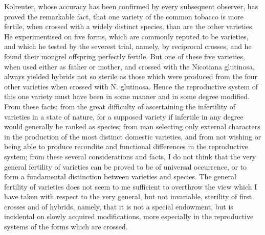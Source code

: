 Kolreuter, whose accuracy has been confirmed by every subsequent observer, has proved the remarkable fact, that one variety of the common tobacco is more fertile, when crossed with a widely distinct species, than are the other varieties. He experimentised on five forms, which are commonly reputed to be varieties, and which he tested by the severest trial, namely, by reciprocal crosses, and he found their mongrel offspring perfectly fertile. But one of these five varieties, when used either as father or mother, and crossed with the Nicotiana glutinosa, always yielded hybrids not so sterile as those which were produced from the four other varieties when crossed with N. glutinosa. Hence the reproductive system of this one variety must have been in some manner and in some degree modified.
From these facts; from the great difficulty of ascertaining the infertility of varieties in a state of nature, for a supposed variety if infertile in any degree would generally be ranked as species; from man selecting only external characters in the production of the most distinct domestic varieties, and from not wishing or being able to produce recondite and functional differences in the reproductive system; from these several considerations and facts, I do not think that the very general fertility of varieties can be proved to be of universal occurrence, or to form a fundamental distinction between varieties and species. The general fertility of varieties does not seem to me sufficient to overthrow the view which I have taken with respect to the very general, but not invariable, sterility of first crosses and of hybrids, namely, that it is not a special endowment, but is incidental on slowly acquired modifications, more especially in the reproductive systems of the forms which are crossed.

